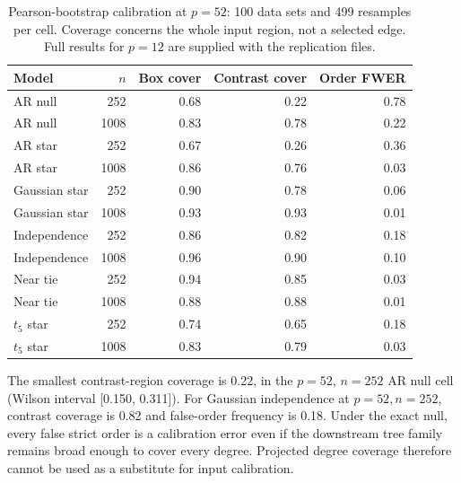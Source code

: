 \begin{table}[htbp]
\caption{Pearson-bootstrap calibration at $p=52$: 100 data sets and 499 resamples per cell. Coverage concerns the whole input region, not a selected edge. Full results for $p=12$ are supplied with the replication files.}\label{tab:bootstrap}
\centering\small
\begin{tabular}{lrrrr}
\toprule
Model & $n$ & Box cover & Contrast cover & Order FWER \\
\midrule
AR null & 252 & 0.68 & 0.22 & 0.78 \\
AR null & 1008 & 0.83 & 0.78 & 0.22 \\
AR star & 252 & 0.67 & 0.26 & 0.36 \\
AR star & 1008 & 0.86 & 0.76 & 0.03 \\
Gaussian star & 252 & 0.90 & 0.78 & 0.06 \\
Gaussian star & 1008 & 0.93 & 0.93 & 0.01 \\
Independence & 252 & 0.86 & 0.82 & 0.18 \\
Independence & 1008 & 0.96 & 0.90 & 0.10 \\
Near tie & 252 & 0.94 & 0.85 & 0.03 \\
Near tie & 1008 & 0.88 & 0.88 & 0.01 \\
$t_5$ star & 252 & 0.74 & 0.65 & 0.18 \\
$t_5$ star & 1008 & 0.83 & 0.79 & 0.03 \\
\bottomrule
\end{tabular}
\end{table}
The smallest contrast-region coverage is 0.22, in the $p=52$, $n=252$ AR null cell (Wilson interval [0.150, 0.311]). For Gaussian independence at $p=52,n=252$, contrast coverage is 0.82 and false-order frequency is 0.18. Under the exact null, every false strict order is a calibration error even if the downstream tree family remains broad enough to cover every degree. Projected degree coverage therefore cannot be used as a substitute for input calibration.

